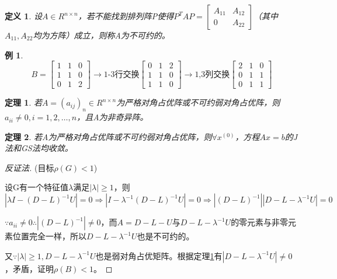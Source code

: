 \documentclass[a4paper]{article}
\newtheorem{definition}{定义}[section]
\newtheorem{theorem}{定理}[section]
\newtheorem{example}{例}[section]
\begin{document}
\begin{definition}
  设$A \in R^{n\times n}$，若不能找到排列阵P使得$P^TAP=\left[
    \begin{matrix}
      A_{11} & A_{12} \\
      0 & A_{22}
    \end{matrix}
    \right]$（其中$A_{11},A_{22} $均为方阵）成立，则称A为不可约的。
\end{definition}
\begin{example}
  $$B=\left[\begin{matrix}
    1 & 1 & 0 \\
    1 & 1 & 0 \\
    0 & 1 & 2 
  \end{matrix}\right]\rightarrow\text{1-3行交换}\left[\begin{matrix}
    0 & 1 & 2 \\
    1 & 1 & 0 \\
    1 & 1 & 0 
  \end{matrix}\right]\rightarrow\text{1,3列交换}\left[
    \begin{matrix}
      2 & 1 & 0 \\
      0 & 1 & 1 \\
      0 & 1 & 1
    \end{matrix}
    \right]
  $$
\end{example}

\begin{theorem}
  若$A=(a_{ij})_n \in R^{n\times n}$为严格对角占优阵或不可约弱对角占优阵，则$a_{ii}\neq 0, i=1,2,\dots, n$，且A为非奇异阵。
  \label{theorem:5.7}
\end{theorem}

\begin{theorem}
  若A为严格对角占优阵或不可约弱对角占优阵，则$\forall x^{(0)} $，方程$Ax=b$的J法和GS法均收敛。
\end{theorem}
\begin{proof}
  [反证法](目标$\rho(G)<1$)
  
  设G有一个特征值$\lambda$满足$|\lambda|\ge 1$，则$|\lambda I-(D-L)^{-1}U|=0\Rightarrow |I-\lambda^{-1}(D-L)^{-1}U |=0\Rightarrow |(D-L)^{-1}||D-L-\lambda^{-1}U |=0 $
  
  $\because a_{ii}\neq 0 \therefore |(D-L)^{-1} |\neq 0 $，而$A=D-L-U$与$D-L-\lambda^{-1}U$的零元素与非零元素位置完全一样，所以$D-L-\lambda^{-1}U$也是不可约的。
  
  又$\because |\lambda|\ge 1, D-L-\lambda^{-1}U $也是弱对角占优矩阵。根据定理\ref{theorem:5.7}有$|D-L-\lambda^{-1}U|\neq 0 $，矛盾，证明$\rho(B)<1$。
\end{proof}
\end{document}
